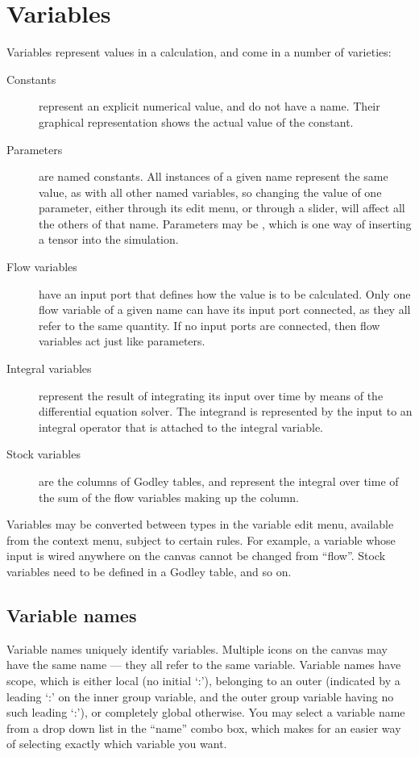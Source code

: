 \section{Variables}\label{Variable:constant}\label{Variable:parameter}
\label{Variable:flow}\label{Variable:integral}\label{Variable:stock}

Variables represent values in a calculation, and come in a number of
varieties:
\begin{description}
\item[Constants] represent an explicit numerical value, and do not
have a name. Their graphical representation shows the actual value of
the constant.
\item[Parameters] are named constants. All instances of a given name
  represent the same value, as with all other named variables, so
  changing the value of one parameter, either through its edit menu,
  or through a slider, will affect all the others of that
  name. Parameters may be , which is one way of inserting a tensor into the
  simulation.
\item[Flow variables] have an input port that defines how the value is
to be calculated. Only one flow variable of a given name can have its
input port connected, as they all refer to the same quantity. If no
input ports are connected, then flow variables act just like
parameters.
\item[Integral variables] represent the result of integrating its
input over time  by means of the differential
equation solver. The integrand is represented by the input to an
integral operator that is attached to the integral variable.
\item[Stock variables] are the columns of Godley tables, and represent
the integral over time of the sum of the flow variables making up the
column.
\end{description}

Variables may be converted between types in the variable edit menu,
available from the context menu, subject to certain rules. For example,
a variable whose input is wired anywhere on the canvas cannot be
changed from ``flow''. Stock variables need to be defined in a Godley
table, and so on.

\subsection{Variable names}

Variable names uniquely identify variables. Multiple icons on the
canvas may have the same name --- they all refer to the same
variable. Variable names have scope, which is either local (no initial
`:'), belonging to an outer  (indicated by a leading `:' on the
inner group variable, and the outer group variable having no such
leading `:'), or completely global otherwise. You may select a
variable name from a drop down list in the ``name'' combo box, which
makes for an easier way of selecting exactly which variable you want.

